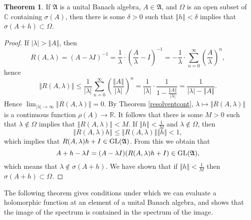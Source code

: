 \documentclass{article}
\newcommand{\GL}{\ensuremath\mathrm{GL}}
\newcommand{\norm}[1]{\left\Vert #1 \right\Vert}
\theoremstyle{definition}
\newtheorem{theorem}{Theorem}
\theoremstyle{definition}
\begin{document}
 \begin{theorem}
 If $\mathfrak{A}$ is a unital Banach algebra, $A \in \mathfrak{A}$, and $\Omega$ is an open subset of $\mathbb{C}$ containing
 $\sigma(A)$, then there is some $\delta>0$ such that $\norm{h}<\delta$ implies that $\sigma(A+h) \subset \Omega$.
 \end{theorem}
 \begin{proof}
 If $|\lambda|>\norm{A}$, then
\[
R(A,\lambda)=\left(A-\lambda I \right)^{-1}= \frac{1}{\lambda} \cdot \left(\frac{A}{\lambda}- I\right)^{-1}=-\frac{1}{\lambda} \cdot \sum_{n=0}^\infty \left( \frac{A}{\lambda} \right)^n,
\]
hence
\[
\norm{R(A,\lambda)} \leq \frac{1}{|\lambda|} \sum_{n=0}^\infty \left( \frac{\norm{A}}{|\lambda|} \right)^n=\frac{1}{|\lambda|} \cdot \frac{1}{1-\frac{\norm{A}}{|\lambda|}}
=\frac{1}{|\lambda|-\norm{A}}.
\]
Hence $\lim_{|\lambda| \to \infty} \norm{R(A,\lambda)}=0$.
By Theorem \ref{resolventcont}, $\lambda \mapsto \norm{R(A,\lambda)}$ is a continuous function $\rho(A) \to \mathbb{R}$. 
It follows that there is some $M>0$ such that $\lambda \not \in \Omega$ implies that $\norm{R(A,\lambda)}<M$.
If $\norm{h}<\frac{1}{M}$ and $\lambda \not \in \Omega$,
then
\[
\norm{R(A,\lambda)h} \leq \norm{R(A,\lambda)} \norm{h} < 1,
\]
which implies that $R(A,\lambda)h+I \in \GL(\mathfrak{A})$. 
From this we obtain that
\[
A+h-\lambda I=(A-\lambda I)(R(A,\lambda)h+I) \in \GL(\mathfrak{A}),
\]
which means that $\lambda \not \in \sigma(A+h)$. We have shown that if $\norm{h}<\frac{1}{M}$ then
$\sigma(A+h) \subset \Omega$.
 \end{proof}
 
  
The following theorem gives conditions under which we can evaluate a holomorphic function at an element of a unital Banach algebra, and shows
that the image of the spectrum is contained in the spectrum of the image.
\end{document}
